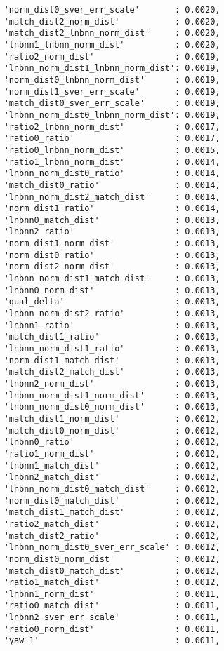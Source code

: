 \begin{verbatim}
    'norm_dist0_sver_err_scale'       : 0.0020,
    'match_dist2_norm_dist'           : 0.0020,
    'match_dist2_lnbnn_norm_dist'     : 0.0020,
    'lnbnn1_lnbnn_norm_dist'          : 0.0020,
    'ratio2_norm_dist'                : 0.0019,
    'lnbnn_norm_dist1_lnbnn_norm_dist': 0.0019,
    'norm_dist0_lnbnn_norm_dist'      : 0.0019,
    'norm_dist1_sver_err_scale'       : 0.0019,
    'match_dist0_sver_err_scale'      : 0.0019,
    'lnbnn_norm_dist0_lnbnn_norm_dist': 0.0019,
    'ratio2_lnbnn_norm_dist'          : 0.0017,
    'ratio0_ratio'                    : 0.0017,
    'ratio0_lnbnn_norm_dist'          : 0.0015,
    'ratio1_lnbnn_norm_dist'          : 0.0014,
    'lnbnn_norm_dist0_ratio'          : 0.0014,
    'match_dist0_ratio'               : 0.0014,
    'lnbnn_norm_dist2_match_dist'     : 0.0014,
    'norm_dist1_ratio'                : 0.0014,
    'lnbnn0_match_dist'               : 0.0013,
    'lnbnn2_ratio'                    : 0.0013,
    'norm_dist1_norm_dist'            : 0.0013,
    'norm_dist0_ratio'                : 0.0013,
    'norm_dist2_norm_dist'            : 0.0013,
    'lnbnn_norm_dist1_match_dist'     : 0.0013,
    'lnbnn0_norm_dist'                : 0.0013,
    'qual_delta'                      : 0.0013,
    'lnbnn_norm_dist2_ratio'          : 0.0013,
    'lnbnn1_ratio'                    : 0.0013,
    'match_dist1_ratio'               : 0.0013,
    'lnbnn_norm_dist1_ratio'          : 0.0013,
    'norm_dist1_match_dist'           : 0.0013,
    'match_dist2_match_dist'          : 0.0013,
    'lnbnn2_norm_dist'                : 0.0013,
    'lnbnn_norm_dist1_norm_dist'      : 0.0013,
    'lnbnn_norm_dist0_norm_dist'      : 0.0013,
    'match_dist1_norm_dist'           : 0.0012,
    'match_dist0_norm_dist'           : 0.0012,
    'lnbnn0_ratio'                    : 0.0012,
    'ratio1_norm_dist'                : 0.0012,
    'lnbnn1_match_dist'               : 0.0012,
    'lnbnn2_match_dist'               : 0.0012,
    'lnbnn_norm_dist0_match_dist'     : 0.0012,
    'norm_dist0_match_dist'           : 0.0012,
    'match_dist1_match_dist'          : 0.0012,
    'ratio2_match_dist'               : 0.0012,
    'match_dist2_ratio'               : 0.0012,
    'lnbnn_norm_dist0_sver_err_scale' : 0.0012,
    'norm_dist0_norm_dist'            : 0.0012,
    'match_dist0_match_dist'          : 0.0012,
    'ratio1_match_dist'               : 0.0012,
    'lnbnn1_norm_dist'                : 0.0011,
    'ratio0_match_dist'               : 0.0011,
    'lnbnn2_sver_err_scale'           : 0.0011,
    'ratio0_norm_dist'                : 0.0011,
    'yaw_1'                           : 0.0011,

\end{verbatim}
